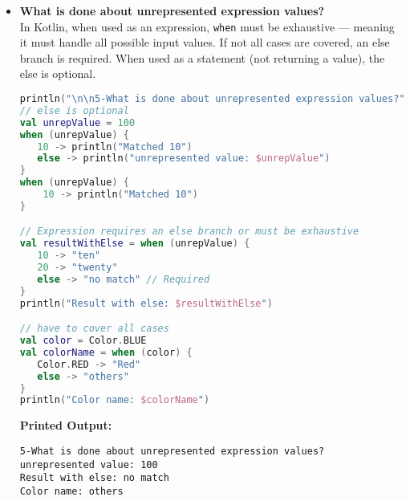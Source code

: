 \documentclass{article}
\begin{document}
\begin{itemize}
\begin{lstlisting}[language=Kotlin]
// functions
fun isEven(n: Int) = n % 2 == 0
fun isOdd(n: Int) = n % 2 == 1
when {
    isEven(caseValue) -> println("$caseValue is even")
    isOdd(caseValue) -> println("$caseValue is odd")
}

// Type checking
val anyValue: Any = "Hello"
when (anyValue) {
   is String -> println("anyValue is a String: $anyValue, and its length is ${anyValue.length}")
   is Int -> println("anyValue is an Int: $anyValue")
   is Boolean -> println("anyValue is a Boolean: $anyValue")
   else -> println("anyValue is of some other type")
}
\end{lstlisting}
\textbf{Printed Output:} \begin{verbatim}
4-How are case values specified?
Matched 3
Matched 1, 2, or 3
Matched 3 (2+1)
Matched b (3)
Matched range 1..3
Positive value between 1 and 3
3 is odd
anyValue is a String: Hello
\end{verbatim}






\item \textbf{What is done about unrepresented expression values?} \\
In Kotlin, when used as an expression, \texttt{when} must be exhaustive — meaning it must handle all possible input values. If not all cases are covered, an else branch is required. When used as a statement (not returning a value), the else is optional.
\begin{lstlisting}[language=Kotlin]
println("\n\n5-What is done about unrepresented expression values?")     
// else is optional
val unrepValue = 100
when (unrepValue) {
   10 -> println("Matched 10")
   else -> println("unrepresented value: $unrepValue") 
}
when (unrepValue) {
    10 -> println("Matched 10")
}

// Expression requires an else branch or must be exhaustive
val resultWithElse = when (unrepValue) {
   10 -> "ten"
   20 -> "twenty"
   else -> "no match" // Required
}
println("Result with else: $resultWithElse")

// have to cover all cases
val color = Color.BLUE
val colorName = when (color) {
   Color.RED -> "Red"
   else -> "others" 
}
println("Color name: $colorName")
\end{lstlisting}
\textbf{Printed Output:} 
\begin{verbatim}
5-What is done about unrepresented expression values?
unrepresented value: 100
Result with else: no match
Color name: others
\end{verbatim}

\end{itemize}
\newpage
\end{document}
